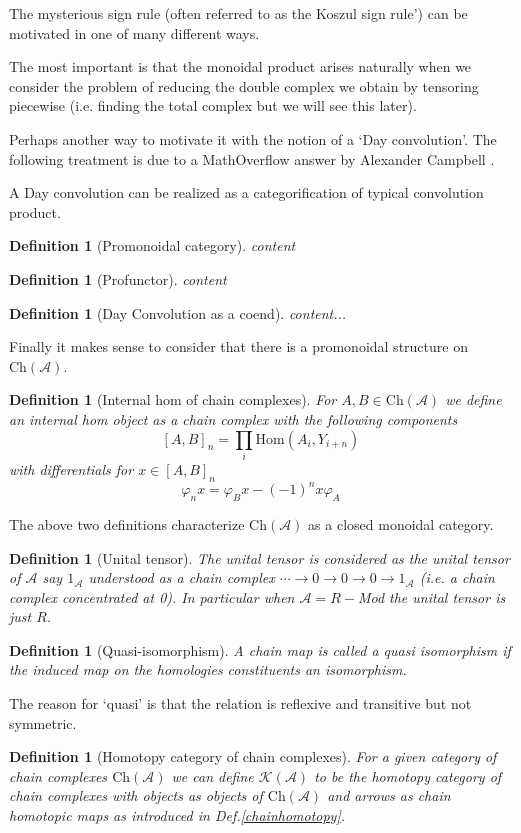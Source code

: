 \documentclass[12pt]{report}
\numberwithin{equation}{section}
\newtheorem{definition}[dummy]{Definition}
\begin{document}
	The mysterious sign rule (often referred to as the Koszul sign rule') can be motivated in one of many different ways. 
	
	The most important is that the monoidal product arises naturally when we consider the problem of reducing the double complex we obtain by tensoring piecewise (i.e. finding the total complex but we will see this later).
	
	Perhaps another way to motivate it with the notion of a `Day convolution'. The following treatment is due to a MathOverflow answer by Alexander Campbell \cite{359316}.
	
	A Day convolution can be realized as a categorification of typical convolution product.
	\begin{definition}[Promonoidal category]
		content
	\end{definition}
	\begin{definition}[Profunctor]
		content
	\end{definition}
	\begin{definition}[Day Convolution as a coend]
		content...
	\end{definition}
	Finally it makes sense to consider that there is a promonoidal structure on $\mathrm{Ch}(\mathcal{A})$.
	
	\begin{definition}[Internal hom of chain complexes]\label{internalchain}
		For $A,B \in \mathrm{Ch}(\mathcal{A})$ we define an internal hom object as a chain complex with the following components
		\[ [A,B]_n=\prod_i \mathrm{Hom}(A_i,Y_{i+n})\]
		with differentials for $x \in [A,B]_n$
		\[ \varphi_n x= \varphi_B x-(-1)^n x \varphi_A \]
	\end{definition}
	The above two definitions characterize $\mathrm{Ch}(\mathcal{A})$ as a closed monoidal category. 
	\begin{definition}[Unital tensor]\label{chunittensor}
		The unital tensor is considered as the unital tensor of $\mathcal{A}$ say $1_\mathcal{A}$ understood as a chain complex $\cdots \to 0\to0 \to 0 \to 1_\mathcal{A}$ (i.e. a chain complex concentrated at 0). In particular when $\mathcal{A}=R-$Mod the unital tensor is just $R$.
	\end{definition}
	
	
	
	
	\begin{definition}[Quasi-isomorphism]
		A chain map is called a quasi isomorphism if the induced map on the homologies constituents an isomorphism.
	\end{definition}
	The reason for `quasi' is that the relation is reflexive and transitive but not symmetric. 
	\begin{definition}[Homotopy category of chain complexes]
		For a given category of chain complexes $\mathrm{Ch}(\mathcal{A})$ we can define $\mathcal{K}(\mathcal{A})$ to be the homotopy category of chain complexes with objects as objects of $\mathrm{Ch}(\mathcal{A})$ and arrows as chain homotopic maps as introduced in Def.\ref{chainhomotopy}.
	\end{definition}
	
\end{document}
